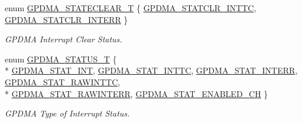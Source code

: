 \begin{DoxyCompactItemize}
\item 
enum \hyperlink{group__GPDMA__17XX__40XX_gabbb281ef4b818f2e60167cf766f94fdb}{G\+P\+D\+M\+A\+\_\+\+S\+T\+A\+T\+E\+C\+L\+E\+A\+R\+\_\+T} \{ \hyperlink{group__GPDMA__17XX__40XX_ggabbb281ef4b818f2e60167cf766f94fdba9a0c8256eb0f656d56f065914219c96c}{G\+P\+D\+M\+A\+\_\+\+S\+T\+A\+T\+C\+L\+R\+\_\+\+I\+N\+T\+TC}, 
\hyperlink{group__GPDMA__17XX__40XX_ggabbb281ef4b818f2e60167cf766f94fdbaf6e975b9dfa7d659d18a377c7873b92a}{G\+P\+D\+M\+A\+\_\+\+S\+T\+A\+T\+C\+L\+R\+\_\+\+I\+N\+T\+E\+RR}
 \}\begin{DoxyCompactList}\small\item\em G\+P\+D\+MA Interrupt Clear Status. \end{DoxyCompactList}
\item 
enum \hyperlink{group__GPDMA__17XX__40XX_ga2f4aa97bd0ffa5046c8e2b17028d99cc}{G\+P\+D\+M\+A\+\_\+\+S\+T\+A\+T\+U\+S\+\_\+T} \{ \\*
\hyperlink{group__GPDMA__17XX__40XX_gga2f4aa97bd0ffa5046c8e2b17028d99ccaf89b610470a940617af6bef4f4451aa9}{G\+P\+D\+M\+A\+\_\+\+S\+T\+A\+T\+\_\+\+I\+NT}, 
\hyperlink{group__GPDMA__17XX__40XX_gga2f4aa97bd0ffa5046c8e2b17028d99ccac093908914ed40148e81169fc15df2f7}{G\+P\+D\+M\+A\+\_\+\+S\+T\+A\+T\+\_\+\+I\+N\+T\+TC}, 
\hyperlink{group__GPDMA__17XX__40XX_gga2f4aa97bd0ffa5046c8e2b17028d99ccaee7927c433e007f270c365bcca865706}{G\+P\+D\+M\+A\+\_\+\+S\+T\+A\+T\+\_\+\+I\+N\+T\+E\+RR}, 
\hyperlink{group__GPDMA__17XX__40XX_gga2f4aa97bd0ffa5046c8e2b17028d99cca4a74b1bc907fbbdbf9dfb05222f0b513}{G\+P\+D\+M\+A\+\_\+\+S\+T\+A\+T\+\_\+\+R\+A\+W\+I\+N\+T\+TC}, 
\\*
\hyperlink{group__GPDMA__17XX__40XX_gga2f4aa97bd0ffa5046c8e2b17028d99ccad547775dc5510034932bf1597931e899}{G\+P\+D\+M\+A\+\_\+\+S\+T\+A\+T\+\_\+\+R\+A\+W\+I\+N\+T\+E\+RR}, 
\hyperlink{group__GPDMA__17XX__40XX_gga2f4aa97bd0ffa5046c8e2b17028d99cca711d88f645a203338f297a286b912767}{G\+P\+D\+M\+A\+\_\+\+S\+T\+A\+T\+\_\+\+E\+N\+A\+B\+L\+E\+D\+\_\+\+CH}
 \}\begin{DoxyCompactList}\small\item\em G\+P\+D\+MA Type of Interrupt Status. \end{DoxyCompactList}
\end{DoxyCompactItemize}
